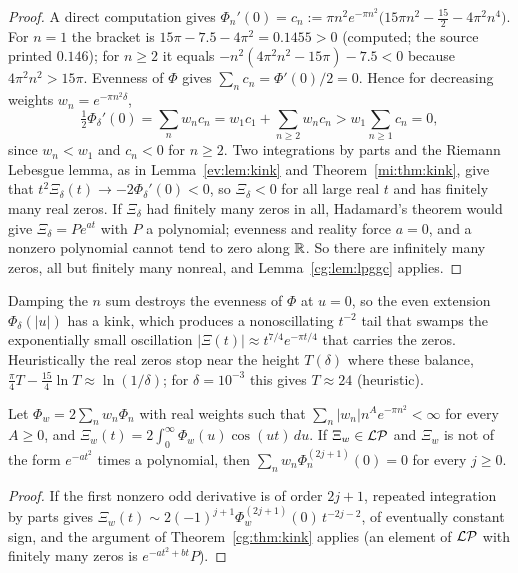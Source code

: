 \begin{proof}
A direct computation gives $\Phi_n'(0)=c_n:=\pi n^2e^{-\pi n^2}\bigl(15\pi n^2-\tfrac{15}2-4\pi^2n^4\bigr)$. For $n=1$ the bracket is $15\pi-7.5-4\pi^2=0.1455>0$ (computed; the source printed $0.146$); for $n\ge2$ it equals $-n^2(4\pi^2n^2-15\pi)-7.5<0$ because $4\pi^2n^2>15\pi$. Evenness of $\Phi$ gives $\sum_nc_n=\Phi'(0)/2=0$. Hence for decreasing weights $w_n=e^{-\pi n^2\delta}$,
\[
\tfrac12\Phi_\delta'(0)=\sum_nw_nc_n=w_1c_1+\sum_{n\ge2}w_nc_n>w_1\sum_{n\ge1}c_n=0,
\]
since $w_n<w_1$ and $c_n<0$ for $n\ge2$. Two integrations by parts and the Riemann Lebesgue lemma, as in Lemma~\ref{ev:lem:kink} and Theorem~\ref{mi:thm:kink}, give that $t^2\Xi_\delta(t)\to-2\Phi_\delta'(0)<0$, so $\Xi_\delta<0$ for all large real $t$ and has finitely many real zeros. If $\Xi_\delta$ had finitely many zeros in all, Hadamard's theorem would give $\Xi_\delta=Pe^{at}$ with $P$ a polynomial; evenness and reality force $a=0$, and a nonzero polynomial cannot tend to zero along $\mathbb{R}$. So there are infinitely many zeros, all but finitely many nonreal, and Lemma~\ref{cg:lem:lpggc} applies.
\end{proof}

Damping the $n$ sum destroys the evenness of $\Phi$ at $u=0$, so the even extension $\Phi_\delta(|u|)$ has a kink, which produces a nonoscillating $t^{-2}$ tail that swamps the exponentially small oscillation $|\Xi(t)|\approx t^{7/4}e^{-\pi t/4}$ that carries the zeros. Heuristically the real zeros stop near the height $T(\delta)$ where these balance, $\frac\pi4T-\frac{15}4\ln T\approx\ln(1/\delta)$; for $\delta=10^{-3}$ this gives $T\approx24$ (heuristic).

\begin{corollary}\label{cg:cor:modular}
Let $\Phi_w=2\sum_nw_n\Phi_n$ with real weights such that $\sum_n|w_n|n^Ae^{-\pi n^2}<\infty$ for every $A\ge0$, and $\Xi_w(t)=2\int_0^\infty\Phi_w(u)\cos(ut)\,du$. If $\Xi_w\in\mathcal{L}\mathcal{P}$ and $\Xi_w$ is not of the form $e^{-at^2}$ times a polynomial, then $\sum_nw_n\Phi_n^{(2j+1)}(0)=0$ for every $j\ge0$.
\end{corollary}

\begin{proof}
If the first nonzero odd derivative is of order $2j+1$, repeated integration by parts gives $\Xi_w(t)\sim2(-1)^{j+1}\Phi_w^{(2j+1)}(0)\,t^{-2j-2}$, of eventually constant sign, and the argument of Theorem~\ref{cg:thm:kink} applies (an element of $\mathcal{L}\mathcal{P}$ with finitely many zeros is $e^{-at^2+bt}P$).
\end{proof}

